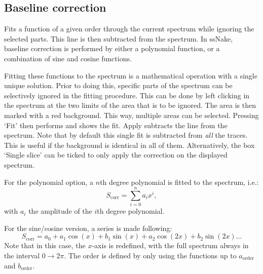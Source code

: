 \documentclass[11pt,a4paper]{article}
\begin{document}
\subsection{Baseline correction}
Fits a function of a given order through the current spectrum while ignoring the
selected parts.  This line is then subtracted from the spectrum. In ssNake,
baseline correction is performed by either a polynomial function, or a
combination of sine and cosine functions.

Fitting these functions to the
spectrum is a mathematical operation with a single unique solution. Prior to
doing this, specific parts of the spectrum can be selectively ignored in the
fitting procedure. This can be done by left clicking in the spectrum at the two
limits of the area that is to be ignored. The area is then marked with a red
background. This way, multiple areas can be selected. Pressing  `Fit' then
performs and shows the fit. Apply subtracts the line from the spectrum. Note
that by default this single fit is subtracted from \textit{all} the traces.
This is useful if the background is identical in all of them. Alternatively,
the box `Single slice' can be ticked to only apply the correction on the
displayed spectrum.

For the polynomial option, a $n$th degree polynomial is fitted to the spectrum,
i.e.:
\begin{equation*}
S_\text{corr} = \sum_{i=0}^n a_i x^i ,
\end{equation*}
with $a_i$ the amplitude of the $i$th degree polynomial. 

For the sine/cosine version, a series is made following:
\begin{equation*}
S_\text{corr} = a_0 + a_1\cos(x) + b_1\sin(x)+ a_2\cos(2x)  + b_2\sin(2x) \ldots
\end{equation*}
Note that in this case, the $x$-axis is redefined, with the full spectrum always
in the interval $0 \rightarrow 2\pi$. The order is defined by only using the
functions up to $a_\text{order}$ and $b_\text{order}$.




\end{document}
